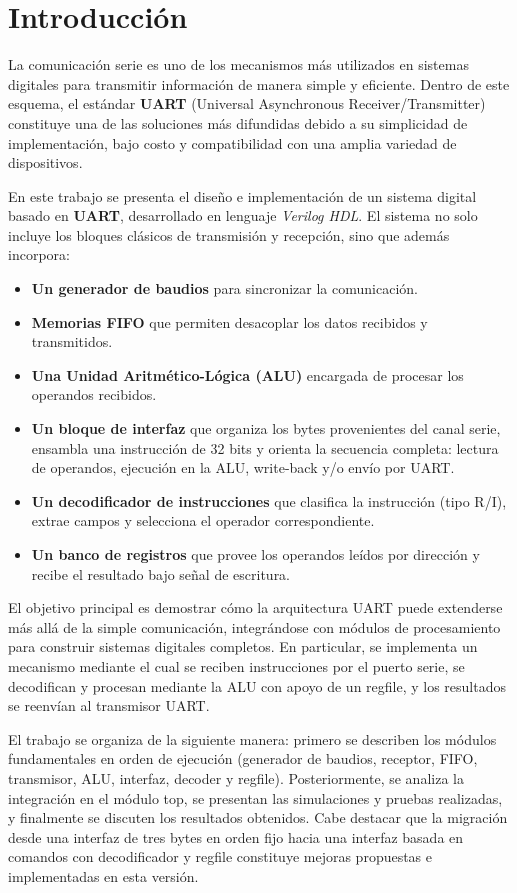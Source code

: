 \section{Introducción}

La comunicación serie es uno de los mecanismos más utilizados en sistemas digitales para transmitir información de manera simple y eficiente. Dentro de este esquema, el estándar \textbf{UART} (Universal Asynchronous Receiver/Transmitter) constituye una de las soluciones más difundidas debido a su simplicidad de implementación, bajo costo y compatibilidad con una amplia variedad de dispositivos.

En este trabajo se presenta el diseño e implementación de un sistema digital basado en \textbf{UART}, desarrollado en lenguaje \textit{Verilog HDL}. El sistema no solo incluye los bloques clásicos de transmisión y recepción, sino que además incorpora:

\begin{itemize}
    \item \textbf{Un generador de baudios} para sincronizar la comunicación.
    \item \textbf{Memorias FIFO} que permiten desacoplar los datos recibidos y transmitidos.
    \item \textbf{Una Unidad Aritmético-Lógica (ALU)} encargada de procesar los operandos recibidos.
    \item \textbf{Un bloque de interfaz} que organiza los bytes provenientes del canal serie, ensambla una instrucción de 32 bits y orienta la secuencia completa: lectura de operandos, ejecución en la ALU, write-back y/o envío por UART.
    \item \textbf{Un decodificador de instrucciones} que clasifica la instrucción (tipo R/I), extrae campos y selecciona el operador correspondiente.
    \item \textbf{Un banco de registros} que provee los operandos leídos por dirección y recibe el resultado bajo señal de escritura.
\end{itemize}

El objetivo principal es demostrar cómo la arquitectura UART puede extenderse más allá de la simple comunicación, integrándose con módulos de procesamiento para construir sistemas digitales completos. En particular, se implementa un mecanismo mediante el cual se reciben instrucciones por el puerto serie, se decodifican y procesan mediante la ALU con apoyo de un regfile, y los resultados se reenvían al transmisor UART.

El trabajo se organiza de la siguiente manera: primero se describen los módulos fundamentales en orden de ejecución (generador de baudios, receptor, FIFO, transmisor, ALU, interfaz, decoder y regfile). Posteriormente, se analiza la integración en el módulo top, se presentan las simulaciones y pruebas realizadas, y finalmente se discuten los resultados obtenidos. Cabe destacar que la migración desde una interfaz de tres bytes en orden fijo hacia una interfaz basada en comandos con decodificador y regfile constituye mejoras propuestas e implementadas en esta versión.
